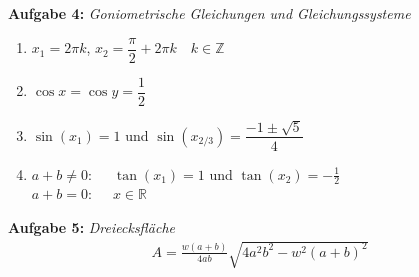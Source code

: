 \vspace{1cm}
%
\textbf{Aufgabe 4: } \emph{Goniometrische Gleichungen und Gleichungssysteme}
\begin{enumerate}[label=(\alph*)]
\item $x_1=2\pi k$, $x_2=\dfrac{\pi}{2}+2\pi k$\ \ $k\in\mathbb{Z}$
\item $\cos x=\cos y=\dfrac{1}{2}$
\item $\sin(x_1)=1$ \hspace{0.3cm}und\hspace{0.3cm} $\sin(x_{2/3})=\dfrac{-1\pm\sqrt{5}}{4}$
\item $a+b\ne 0$:\ \ \ $\tan (x_1)=1$  \hspace{0.2cm}und\hspace{0.2cm} $\tan(x_2)=-\frac{1}{2}$\\
$a+b=0$:\ \ \ $x\in\mathbb{R}$
\end{enumerate}
\vspace{1cm}
%
\textbf{Aufgabe 5: } \emph{Dreiecksfläche}
\begin{align*}
A=\frac{w(a+b)}{4ab}\sqrt{4a^2b^2-w^2(a+b)^2}
\end{align*}\\[0.7cm]
%
